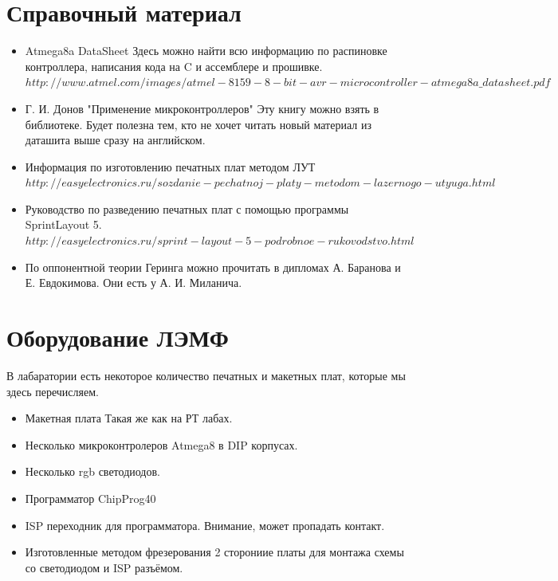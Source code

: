 \documentclass[12pt]{article}
\begin{document}
\section{Справочный материал}
\begin{itemize}
\item Atmega8a DataSheet
\newline Здесь можно найти всю информацию по распиновке контроллера, написания кода на C и ассемблере и прошивке.
\newline $http://www.atmel.com/images/atmel-8159-8-bit-avr-microcontroller-atmega8a\_datasheet.pdf$
\item Г. И. Донов "Применение микроконтроллеров"
\newline Эту книгу можно взять в библиотеке. Будет полезна тем, кто не хочет читать новый материал из даташита выше сразу на английском.
\item Информация по изготовлению печатных плат методом ЛУТ 
\newline $http://easyelectronics.ru/sozdanie-pechatnoj-platy-metodom-lazernogo-utyuga.html$
\item Руководство по разведению печатных плат с помощью программы SprintLayout 5.
\newline $http://easyelectronics.ru/sprint-layout-5-podrobnoe-rukovodstvo.html$
\item По оппонентной теории Геринга можно прочитать в дипломах А. Баранова и Е. Евдокимова. Они есть у А. И. Миланича.
\end{itemize}

\section{Оборудование ЛЭМФ}
В лабаратории есть некоторое количество печатных и макетных плат, которые мы здесь перечисляем.
\begin{itemize}
\item Макетная плата
\newline Такая же как на РТ лабах.
\item Несколько микроконтролеров Atmega8 в DIP корпусах.
\item Несколько rgb светодиодов.
\item Программатор ChipProg40
\item ISP переходник для программатора. Внимание, может пропадать контакт.
\item Изготовленные методом фрезерования 2 сторониие платы для монтажа схемы со светодиодом и ISP разъёмом.
\end{itemize}
\end{document}
